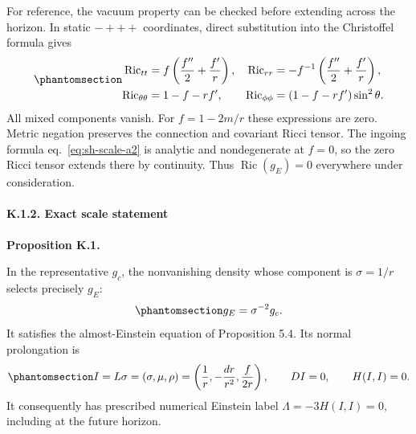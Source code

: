 \documentclass[
  english,
  11pt,
  reqno]{amsart}
\makeatletter
\newcommand{\pandocstatementheading}[1]{%
  \par\addpenalty{\@beginparpenalty}%
  \addvspace{.5\baselineskip plus .2\baselineskip minus .2\baselineskip}%
  {\normalfont\bfseries #1\par}%
  \nobreak\@afterindenttrue\@afterheading
}
\makeatother
\begin{document}
For reference, the vacuum property can be checked before extending
across the horizon. In static \(-+++\) coordinates, direct substitution
into the Christoffel formula gives
\begin{equation}\protect\phantomsection\label{eq:sh-scale-a5}{
\begin{aligned}
\operatorname{Ric}_{tt}&=f\left(\frac{f''}{2}+\frac{f'}r\right),&
\operatorname{Ric}_{rr}&=-f^{-1}\left(\frac{f''}{2}+\frac{f'}r\right),\\
\operatorname{Ric}_{\theta\theta}&=1-f-rf',&
\operatorname{Ric}_{\phi\phi}&=(1-f-rf')\sin^2\theta.
\end{aligned}
}\end{equation} All mixed components vanish. For \(f=1-2m/r\) these
expressions are zero. Metric negation preserves the connection and
covariant Ricci tensor. The ingoing formula eq.~\ref{eq:sh-scale-a2} is
analytic and nondegenerate at \(f=0\), so the zero Ricci tensor extends
there by continuity. Thus \(\operatorname{Ric}(g_E)=0\) everywhere under
consideration.

\protect{}\label{sec:sh-scale-2}

\paragraph{K.1.2. Exact scale
statement}\label{k.1.2.-exact-scale-statement}

\pandocstatementheading{\protect{}\label{prop:sh-scale-1}Proposition K.1.}

In the representative \(g_c\), the nonvanishing density whose component
is \(\sigma=1/r\) selects precisely \(g_E\):
\begin{equation}\protect\phantomsection\label{eq:sh-scale-a6}{
g_E=\sigma^{-2}g_c.
}\end{equation} It satisfies the almost-Einstein equation of Proposition
5.4. Its normal prolongation is
\begin{equation}\protect\phantomsection\label{eq:sh-scale-a7}{
I=L\sigma=(\sigma,\mu,\rho)
=\left(\frac1r,-\frac{dr}{r^2},\frac{f}{2r}\right),
\qquad D I=0,\qquad H(I,I)=0.
}\end{equation} It consequently has prescribed numerical Einstein label
\(\Lambda=-3H(I,I)=0\), including at the future horizon.
\end{document}
